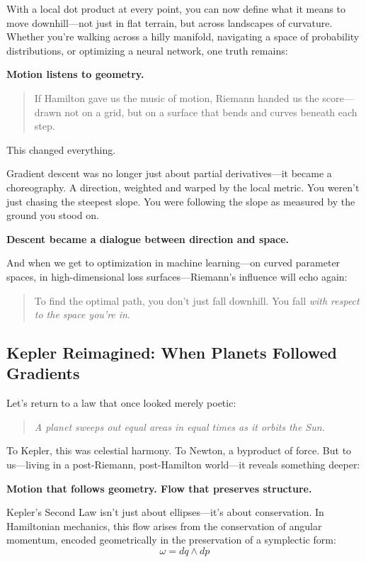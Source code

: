 With a local dot product at every point, you can now define what it means to move downhill—not just in flat terrain, but across landscapes of curvature. Whether you're walking across a hilly manifold, navigating a space of probability distributions, or optimizing a neural network, one truth remains:

\textbf{Motion listens to geometry.}

\begin{quote}
If Hamilton gave us the music of motion,  
Riemann handed us the score—drawn not on a grid,  
but on a surface that bends and curves beneath each step.
\end{quote}

This changed everything.

Gradient descent was no longer just about partial derivatives—it became a choreography. A direction, weighted and warped by the local metric. You weren’t just chasing the steepest slope. You were following the slope as measured by the ground you stood on.

\textbf{Descent became a dialogue between direction and space.}

And when we get to optimization in machine learning—on curved parameter spaces, in high-dimensional loss surfaces—Riemann’s influence will echo again:

\begin{quote}
To find the optimal path, you don’t just fall downhill.  
You fall \textit{with respect to the space you’re in}.
\end{quote}



\subsection{Kepler Reimagined: When Planets Followed Gradients}

Let’s return to a law that once looked merely poetic:

\begin{quote}
\textit{A planet sweeps out equal areas in equal times as it orbits the Sun.}
\end{quote}

To Kepler, this was celestial harmony. To Newton, a byproduct of force.  
But to us—living in a post-Riemann, post-Hamilton world—it reveals something deeper:

\textbf{Motion that follows geometry. Flow that preserves structure.}

Kepler’s Second Law isn’t just about ellipses—it’s about conservation. In Hamiltonian mechanics, this flow arises from the conservation of angular momentum, encoded geometrically in the preservation of a symplectic form:
\[
\omega = dq \wedge dp
\]

